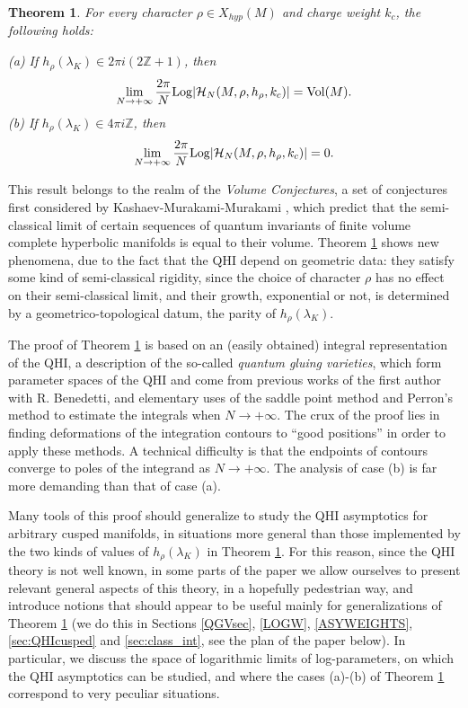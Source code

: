 \documentclass[11pt]{amsart}
\newtheorem{teo}{Theorem}[section]
\newcommand{\mz}{\mathbb{Z}}
\newcommand{\Log}{{\rm Log}}
\newcommand{\Hh}{{\mathcal H}}
\newcommand{\ra}{\rightarrow}
\begin{document}
\begin{teo}\label{asyinvteo} For every character $\rho\in X_{hyp}(M)$ and charge weight $k_c$, the following holds:
	\smallskip
	
	\noindent (a) If $h_\rho(\lambda_{K}) \in 2\pi i(2\mz+1)$, then 
	$$\lim_{N\ra +\infty} \frac{2\pi}{N} \Log \vert \Hh_{N}(M,\rho,h_\rho,k_c)\vert = {\rm Vol}(M).$$ 
	(b) If $h_\rho(\lambda_{K}) \in 4\pi i \mz$, then
	$$\lim_{N\ra +\infty} \frac{2\pi}{N} \Log \vert \Hh_{N}(M,\rho,h_\rho,k_c)\vert = 0.$$
	
\end{teo} 
This result belongs to the realm of the \textit{Volume Conjectures}, a set of conjectures first considered by Kashaev-Murakami-Murakami \cite{Kvol,MM}, which predict that the semi-classical limit of certain sequences of quantum invariants of finite volume complete hyperbolic manifolds is equal to their volume. Theorem \ref{asyinvteo} shows new phenomena, due to the fact that the QHI depend on geometric data: they satisfy some kind of semi-classical rigidity, since the choice of character $\rho$ has no effect on their semi-classical limit, and their growth, exponential or not, is determined by a geometrico-topological datum, the parity of $h_\rho(\lambda_{K})$. 

The proof of Theorem \ref{asyinvteo} is based on an (easily obtained) integral representation of the QHI, a description of the so-called {\it quantum gluing varieties}, which form parameter spaces of the QHI and come from previous works of the first author with R. Benedetti, and elementary uses of the saddle point method and Perron's method to estimate the integrals when $N\to +\infty$. The crux of the proof lies in finding deformations of the integration contours to ``good positions'' in order to apply these methods. A technical difficulty is that the endpoints of contours converge to poles of the integrand as $N\to +\infty$. The analysis of case (b) is far more demanding than that of case (a).

Many tools of this proof should generalize to study the QHI asymptotics for arbitrary cusped manifolds, in situations more general than those implemented by the two kinds of values of $h_\rho(\lambda_{K})$ in Theorem \ref{asyinvteo}. For this reason, since the QHI theory is not well known, in some parts of the paper we allow ourselves to present relevant general aspects of this theory, in a hopefully pedestrian way, and introduce notions that should appear to be useful mainly for generalizations of Theorem \ref{asyinvteo} (we do this in Sections \ref{QGVsec}, \ref{LOGW}, \ref{ASYWEIGHTS}, \ref{sec:QHIcusped} and \ref{sec:class_int}, see the plan of the paper below). In particular, we discuss the space of logarithmic limits of log-parameters, on which the QHI asymptotics can be studied, and where the cases (a)-(b) of Theorem \ref{asyinvteo} correspond to very peculiar situations.
\end{document}
